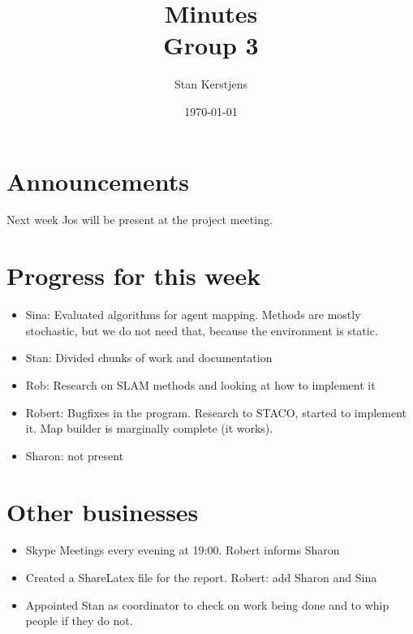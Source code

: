 \documentclass{article}
\title{Minutes\\Group 3}
\author{Stan Kerstjens}
\date{\today}
\begin{document}
\maketitle
\section{Announcements}
	Next week Jos will be present at the project meeting.

\section{Progress for this week}
	\begin{itemize}
		\item Sina: Evaluated algorithms for agent mapping. Methods are mostly stochastic, but we do not need that, because the environment is static.
		\item Stan: Divided chunks of work and documentation
		\item Rob: Research on SLAM methods and looking at how to implement it
		\item Robert: Bugfixes in the program. Research to STACO, started to implement it. Map builder is marginally complete (it works).
		\item Sharon: not present
	\end{itemize}

\section{Other businesses}
	\begin{itemize}
	\item Skype Meetings every evening at 19:00.
		\subitem Robert informs Sharon

	\item Created a ShareLatex file for the report.
		\subitem Robert: add Sharon and Sina

	\item Appointed Stan as coordinator to check on work being done and to whip people if they do not.
	\end{itemize}
\end{document}
